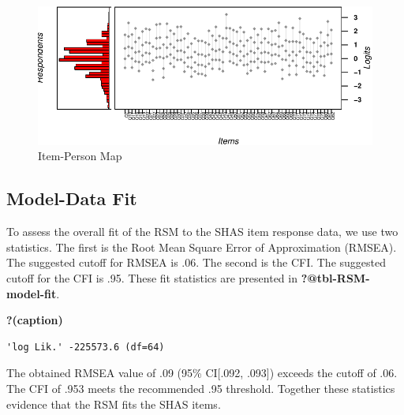 \documentclass[
  letterpaper,
  DIV=11,
  numbers=noendperiod]{scrreport}
\begin{document}
\begin{figure}

{\centering \includegraphics{./results_files/figure-pdf/fig-RSM-WrightMap-1.pdf}

}

\caption{\label{fig-RSM-WrightMap}Item-Person Map}

\end{figure}

\hypertarget{model-data-fit}{%
\subsection*{Model-Data Fit}\label{model-data-fit}}

To assess the overall fit of the RSM to the SHAS item response data, we
use two statistics. The first is the Root Mean Square Error of
Approximation (RMSEA). The suggested cutoff for RMSEA is .06. The second
is the CFI. The suggested cutoff for the CFI is .95. These fit
statistics are presented in \textbf{?@tbl-RSM-model-fit}.

\begin{table}

\caption{\textbf{?(caption)}}\begin{minipage}[t]{\linewidth}

{\centering 

\begin{verbatim}
'log Lik.' -225573.6 (df=64)
\end{verbatim}

}

\end{minipage}%

\end{table}

The obtained RMSEA value of .09 (95\% CI{[}.092, .093{]}) exceeds the
cutoff of .06. The CFI of .953 meets the recommended .95 threshold.
Together these statistics evidence that the RSM fits the SHAS items.
\end{document}

